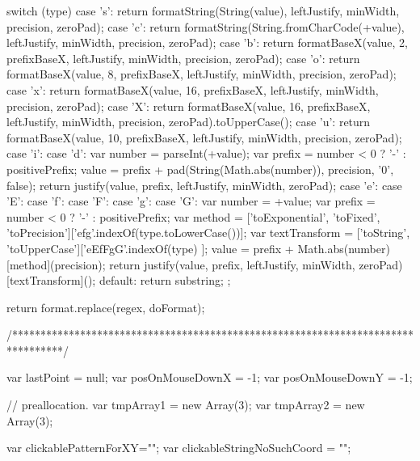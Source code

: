 {{        switch (type) {
            case 's': return formatString(String(value), leftJustify, minWidth, precision, zeroPad);
            case 'c': return formatString(String.fromCharCode(+value), leftJustify, minWidth, precision, zeroPad);
            case 'b': return formatBaseX(value, 2, prefixBaseX, leftJustify, minWidth, precision, zeroPad);
            case 'o': return formatBaseX(value, 8, prefixBaseX, leftJustify, minWidth, precision, zeroPad);
            case 'x': return formatBaseX(value, 16, prefixBaseX, leftJustify, minWidth, precision, zeroPad);
            case 'X': return formatBaseX(value, 16, prefixBaseX, leftJustify, minWidth, precision, zeroPad).toUpperCase();
            case 'u': return formatBaseX(value, 10, prefixBaseX, leftJustify, minWidth, precision, zeroPad);
            case 'i':
            case 'd': {
                        var number = parseInt(+value);
                        var prefix = number < 0 ? '-' : positivePrefix;
                        value = prefix + pad(String(Math.abs(number)), precision, '0', false);
                        return justify(value, prefix, leftJustify, minWidth, zeroPad);
                    }
            case 'e':
            case 'E':
            case 'f':
            case 'F':
            case 'g':
            case 'G':
                        {
                        var number = +value;
                        var prefix = number < 0 ? '-' : positivePrefix;
                        var method = ['toExponential', 'toFixed', 'toPrecision']['efg'.indexOf(type.toLowerCase())];
                        var textTransform = ['toString', 'toUpperCase']['eEfFgG'.indexOf(type) ];
                        value = prefix + Math.abs(number)[method](precision);
                        return justify(value, prefix, leftJustify, minWidth, zeroPad)[textTransform]();
                    }
            default: return substring;
        }
    };

    return format.replace(regex, doFormat);
}
/*********************************************************************************/


var lastPoint = null;
var posOnMouseDownX = -1;
var posOnMouseDownY = -1;

// preallocation.
var tmpArray1 = new Array(3);
var tmpArray2 = new Array(3);

var clickablePatternForXY="";
var clickableStringNoSuchCoord = "";

